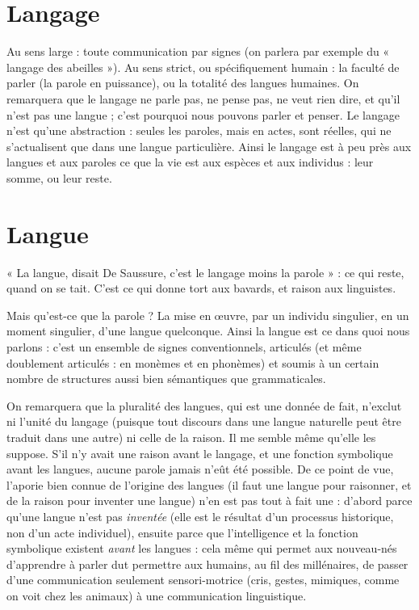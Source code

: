 {\section{Langage}
Au sens large : toute communication par signes (on parlera par
exemple du « langage des abeilles »). Au sens strict, ou spécifiquement
humain : la faculté de parler (la parole en puissance), ou la totalité des
langues humaines. On remarquera que le langage ne parle pas, ne pense pas, ne
veut rien dire, et qu’il n’est pas une langue ; c’est pourquoi nous pouvons parler
et penser. Le langage n’est qu’une abstraction : seules les paroles, mais en actes,
sont réelles, qui ne s’actualisent que dans une langue particulière. Ainsi le langage
est à peu près aux langues et aux paroles ce que la vie est aux espèces et aux
individus : leur somme, ou leur reste.

\section{Langue}
« La langue, disait De Saussure, c’est le langage moins la parole » :
ce qui reste, quand on se tait. C’est ce qui donne tort aux bavards,
et raison aux linguistes.

Mais qu'est-ce que la parole ? La mise en œuvre, par un individu singulier,
en un moment singulier, d’une langue quelconque. Ainsi la langue est ce dans
quoi nous parlons : c’est un ensemble de signes conventionnels, articulés (et
même doublement articulés : en monèmes et en phonèmes) et soumis à un certain
nombre de structures aussi bien sémantiques que grammaticales.

On remarquera que la pluralité des langues, qui est une donnée de fait,
n'exclut ni l’unité du langage (puisque tout discours dans une langue naturelle
peut être traduit dans une autre) ni celle de la raison. Il me semble même
qu’elle les suppose. S'il n’y avait une raison avant le langage, et une fonction
symbolique avant les langues, aucune parole jamais n’eût été possible. De ce
point de vue, l’aporie bien connue de l’origine des langues (il faut une langue
pour raisonner, et de la raison pour inventer une langue) n’en est pas tout à fait
une : d’abord parce qu’une langue n’est pas {\it inventée} (elle est le résultat d’un
processus historique, non d’un acte individuel), ensuite parce que l'intelligence
et la fonction symbolique existent {\it avant} les langues : cela même qui permet aux
nouveau-nés d'apprendre à parler dut permettre aux humains, au fil des millénaires,
de passer d’une communication seulement sensori-motrice (cris, gestes,
mimiques, comme on voit chez les animaux) à une communication linguistique.

}

